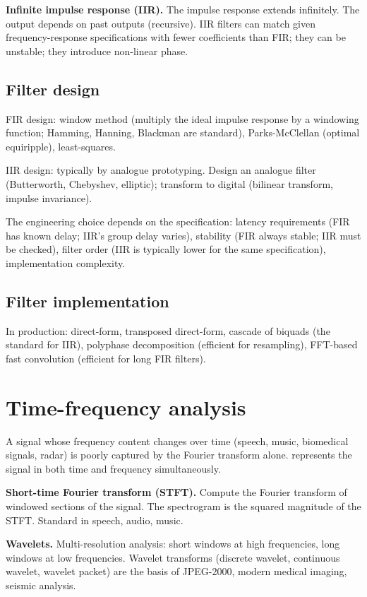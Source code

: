 \textbf{Infinite impulse response (IIR).} The impulse response extends infinitely. The output depends on past outputs (recursive). IIR filters can match given frequency-response specifications with fewer coefficients than FIR; they can be unstable; they introduce non-linear phase.

\subsection{Filter design}

FIR design: window method (multiply the ideal impulse response by a windowing function; Hamming, Hanning, Blackman are standard), Parks-McClellan (optimal equiripple), least-squares.

IIR design: typically by analogue prototyping. Design an analogue filter (Butterworth, Chebyshev, elliptic); transform to digital (bilinear transform, impulse invariance).

The engineering choice depends on the specification: latency requirements (FIR has known delay; IIR's group delay varies), stability (FIR always stable; IIR must be checked), filter order (IIR is typically lower for the same specification), implementation complexity.

\subsection{Filter implementation}

In production: direct-form, transposed direct-form, cascade of biquads (the standard for IIR), polyphase decomposition (efficient for resampling), FFT-based fast convolution (efficient for long FIR filters).

\section{Time-frequency analysis}

A signal whose frequency content changes over time (speech, music, biomedical signals, radar) is poorly captured by the Fourier transform alone.  represents the signal in both time and frequency simultaneously.

\textbf{Short-time Fourier transform (STFT).} Compute the Fourier transform of windowed sections of the signal. The spectrogram is the squared magnitude of the STFT. Standard in speech, audio, music.

\textbf{Wavelets.} Multi-resolution analysis: short windows at high frequencies, long windows at low frequencies. Wavelet transforms (discrete wavelet, continuous wavelet, wavelet packet) are the basis of JPEG-2000, modern medical imaging, seismic analysis.

